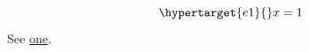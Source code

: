 \documentclass{article}
\begin{document}
\begin{equation}\hypertarget{e1}{}x = 1\end{equation}
See \hyperlink{e1}{one}.
\end{document}
